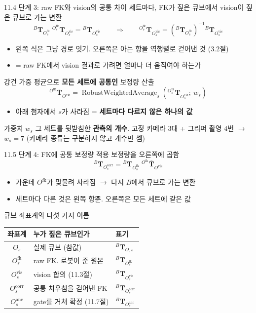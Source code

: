 \documentclass[aspectratio=169,11pt]{beamer}
\newcommand{\T}[3][]{{}^{#2}\mathbf{T}^{#1}_{#3}}   %
\newcommand{\Tb}[2]{{}^{#1}\overline{\mathbf{T}}_{#2}} %
\newcommand{\Ofk}{O^{\mathrm{fk}}}     %
\newcommand{\Ovis}{O^{\mathrm{vis}}}   %
\newcommand{\Ocorr}{O^{\mathrm{corr}}} %
\newcommand{\Oanc}{O^{\mathrm{anc}}}   %
\begin{document}
\begin{frame}{11.4 단계 3: raw FK와 vision의 공통 차이}
  세트마다, FK가 짚은 큐브에서 vision이 짚은 큐브로 가는 변환
  \[
    \T{B}{\Ofk_s}\;\T{\Ofk_s}{\Ovis_s}
    =
    \T{B}{\Ovis_s}
    \qquad\Longrightarrow\qquad
    \T{\Ofk_s}{\Ovis_s}
    =
    \left(\T{B}{\Ofk_s}\right)^{-1}\T{B}{\Ovis_s}
  \]
  \begin{itemize}
    \item 왼쪽 식은 그냥 경로 잇기. 오른쪽은 아는 항을 역행렬로 걷어낸 것 (3.2절)
    \item = raw FK에서 vision 결과로 가려면 얼마나 더 움직여야 하는가
  \end{itemize}
  \vfill
  강건 가중 평균으로 \textbf{모든 세트에 공통인} 보정량 산출
  \[
    \Tb{\Ofk}{\Ovis}
    =
    \operatorname{RobustWeightedAverage}_s
    \left(\T{\Ofk_s}{\Ovis_s};\ w_s\right)
  \]
  \begin{itemize}
    \item 아래 첨자에서 $s$가 사라짐 = \textbf{세트마다 다르지 않은 하나의 값}
  \end{itemize}
  \vfill
  \begin{block}{가중치 $w_s$}
    그 세트를 뒷받침한 \textbf{관측의 개수}.
    고정 카메라 $3$대 + 그리퍼 촬영 $4$번 $\rightarrow$ $w_s=7$
    (카메라 종류는 구분하지 않고 개수만 셈)
  \end{block}
\end{frame}

\begin{frame}{11.5 단계 4: FK에 공통 보정량 적용}
  보정량을 오른쪽에 곱함
  \[
    \T{B}{\Ocorr_s}
    =
    \T{B}{\Ofk_s}\;\Tb{\Ofk}{\Ovis}
  \]
  \begin{itemize}
    \item 가운데 $\Ofk$가 맞물려 사라짐 $\rightarrow$ 다시 $B$에서 큐브로 가는 변환
    \item 세트마다 다른 것은 왼쪽 항뿐. 오른쪽은 모든 세트에 같은 값
  \end{itemize}
  \vfill
  \begin{block}{큐브 좌표계의 다섯 가지 이름}
    \begin{center}
      \small
      \begin{tabular}{cll}
        \toprule
        좌표계 & 누가 짚은 큐브인가 & 표기 \\
        \midrule
        $O_s$      & 실제 큐브 (참값)          & $\T{B}{O,s}$ \\
        $\Ofk_s$   & raw FK. 로봇이 준 원본     & $\T{B}{\Ofk_s}$ \\
        $\Ovis_s$  & vision 합의 (11.3절)      & $\T{B}{\Ovis_s}$ \\
        $\Ocorr_s$ & 공통 치우침을 걷어낸 FK    & $\T{B}{\Ocorr_s}$ \\
        $\Oanc_s$  & gate를 거쳐 확정 (11.7절)  & $\T{B}{\Oanc_s}$ \\
        \bottomrule
      \end{tabular}
    \end{center}
  \end{block}
\end{frame}
\end{document}
